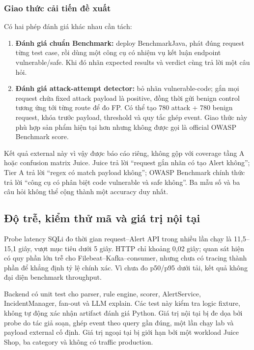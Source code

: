 \documentclass[runningheads]{report-template/llncs}
\begin{document}
\subsubsection{Giao thức cải tiến đề xuất}

Có hai phép đánh giá khác nhau cần tách:
\begin{enumerate}
  \item \textbf{Đánh giá chuẩn Benchmark:} deploy BenchmarkJava, phát
  đúng request từng test case, rồi dùng một công cụ có nhiệm vụ kết luận
  endpoint vulnerable/safe. Khi đó nhãn expected results và verdict cùng
  trả lời một câu hỏi.
  \item \textbf{Đánh giá attack-attempt detector:} bỏ nhãn
  vulnerable-code; gắn mọi request chứa fixed attack payload là positive,
  đồng thời gửi benign control tương ứng tới từng route để đo FP. Có thể
  tạo 780 attack + 780 benign request, khóa trước payload, threshold và
  quy tắc ghép event. Giao thức này phù hợp sản phẩm hiện tại hơn nhưng
  không được gọi là official OWASP Benchmark score.
\end{enumerate}

Kết quả external này vì vậy được báo cáo riêng, không gộp với coverage
tầng A hoặc confusion matrix Juice. Juice trả lời ``request gắn nhãn có
tạo Alert không''; Tier A trả lời ``regex có match payload không''; OWASP
Benchmark chính thức trả lời ``công cụ có phân biệt code vulnerable và
safe không''. Ba mẫu số và ba câu hỏi không thể cộng thành một accuracy
duy nhất.

\subsection{Độ trễ, kiểm thử mã và giá trị nội tại}

Probe latency SQLi đo thời gian request--Alert API trong nhiều lần chạy
là 11,5--15,1 giây, vượt mục tiêu dưới 5 giây. HTTP chỉ khoảng 0,02
giây; quan sát hiện có quy phần lớn trễ cho Filebeat--Kafka--consumer,
nhưng chưa có tracing thành phần để khẳng định tỷ lệ chính xác. Vì chưa
đo p50/p95 dưới tải, kết quả không đại diện benchmark throughput.

Backend có unit test cho parser, rule engine, scorer, AlertService,
IncidentManager, fan-out và LLM explain. Các test này kiểm tra logic
fixture, không tự động xác nhận artifact đánh giá Python. Giá trị nội tại
bị đe dọa bởi probe do tác giả soạn, ghép event theo query gần đúng, một
lần chạy lab và payload external cố định. Giá trị ngoại tại bị giới hạn
bởi một workload Juice Shop, ba category và không có traffic production.
\end{document}
